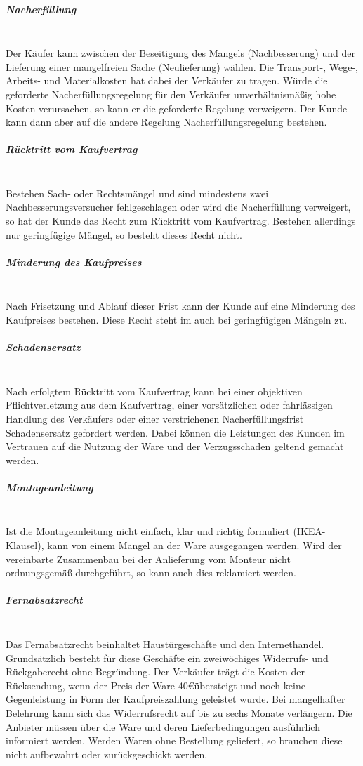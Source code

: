 \subparagraph{Nacherfüllung}~\\
Der Käufer kann zwischen der Beseitigung des Mangels (Nachbesserung) und der Lieferung einer mangelfreien Sache (Neulieferung) wählen. Die Transport-, Wege-, Arbeits- und Materialkosten hat dabei der Verkäufer zu tragen. Würde die geforderte Nacherfüllungsregelung für den Verkäufer unverhältnismäßig hohe Kosten verursachen, so kann er die geforderte Regelung verweigern. Der Kunde kann dann aber auf die andere Regelung Nacherfüllungsregelung bestehen.
	
\subparagraph{Rücktritt vom Kaufvertrag}~\\Bestehen Sach- oder Rechtsmängel und sind mindestens zwei Nachbesserungsversucher fehlgeschlagen oder wird die Nacherfüllung verweigert, so hat der Kunde das Recht zum Rücktritt vom Kaufvertrag. Bestehen allerdings nur geringfügige Mängel, so besteht dieses Recht nicht.

\subparagraph{Minderung des Kaufpreises}~\\Nach Frisetzung und Ablauf dieser Frist kann der Kunde auf eine Minderung des Kaufpreises bestehen. Diese Recht steht im auch bei geringfügigen Mängeln zu.

\subparagraph{Schadensersatz}~\\
Nach erfolgtem Rücktritt vom Kaufvertrag kann bei einer objektiven Pflichtverletzung aus dem Kaufvertrag, einer vorsätzlichen oder fahrlässigen Handlung des Verkäufers oder einer verstrichenen Nacherfüllungsfrist Schadensersatz gefordert werden. Dabei können die Leistungen des Kunden im Vertrauen auf die Nutzung der Ware und der Verzugsschaden geltend gemacht werden.

\subparagraph{Montageanleitung}~\\
Ist die Montageanleitung nicht einfach, klar und richtig formuliert (IKEA-Klausel), kann von einem Mangel an der Ware ausgegangen werden. Wird der vereinbarte Zusammenbau bei der Anlieferung vom Monteur nicht ordnungsgemäß durchgeführt, so kann auch dies reklamiert werden.

\subparagraph{Fernabsatzrecht}~\\
Das Fernabsatzrecht beinhaltet Haustürgeschäfte und den Internethandel. Grundsätzlich besteht für diese Geschäfte ein zweiwöchiges Widerrufs- und Rückgaberecht ohne Begründung. Der Verkäufer trägt die Kosten der Rücksendung, wenn der Preis der Ware 40\euro übersteigt und noch keine Gegenleistung in Form der Kaufpreiszahlung geleistet wurde. Bei mangelhafter Belehrung kann sich das Widerrufsrecht auf bis zu sechs Monate verlängern. Die Anbieter müssen über die Ware und deren Lieferbedingungen ausführlich informiert werden. Werden Waren ohne Bestellung geliefert, so brauchen diese nicht aufbewahrt oder zurückgeschickt werden. 
		
